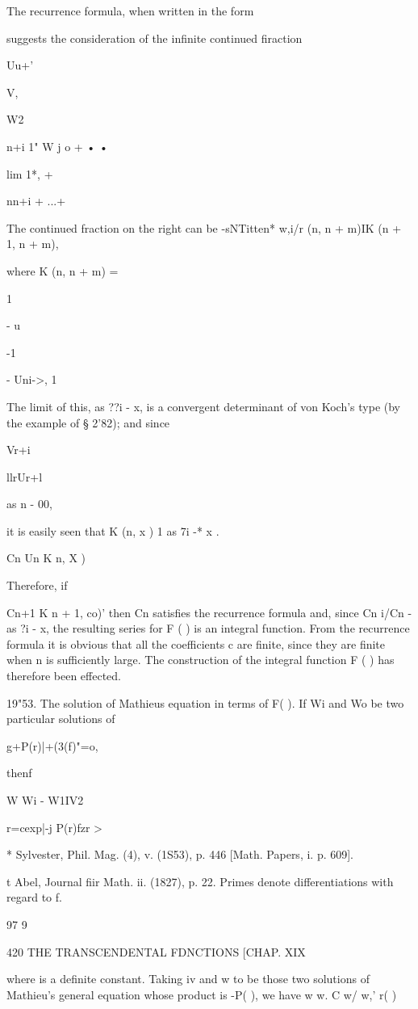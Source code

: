 The recurrence formula, when written in the form

suggests the consideration of the infinite continued firaction

Uu+'

V,

W2

n+i 1" W j o + • •

lim 1*, +

nn+i + ...+

The continued fraction on the right can be -sNTitten* w,i/r (n, n +
m)IK (n + 1, n + m),

where K (n, n + m) =

1

- u

-1

- Uni->, 1

The limit of this, as ??i - x, is a convergent determinant of von
Koch's type (by the example of § 2'82); and since

Vr+i

llrUr+l

as n - 00,

it is easily seen that K (n, x ) 1 as 7i -* x .

Cn Un K n, X )

Therefore, if

Cn+1 K n + 1, co)' then Cn satisfies the recurrence formula and, since
Cn i/Cn - as ?i - x, the resulting series for F ( ) is an integral
function. From the recurrence formula it is obvious that all the
coefficients c are finite, since they are finite when n is
sufficiently large. The construction of the integral function F ( )
has therefore been effected.

19"53. The solution of Mathieus equation in terms of F( ). If Wi and
Wo be two particular solutions of

g+P(r)|+(3(f)"=o,

thenf

W Wi - W1IV2

r=cexp|-j P(r)fzr >

* Sylvester, Phil. Mag. (4), v. (1S53), p. 446 [Math. Papers, i. p.
609].

t Abel, Journal fiir Math. ii. (1827), p. 22. Primes denote
differentiations with regard to f.

97 9

420 THE TRANSCENDENTAL FDNCTIONS [CHAP. XIX

where is a definite constant. Taking iv and w to be those two
solutions of Mathieu's general equation whose product is -P( ), we
have w w. C w/ w,' r( )

